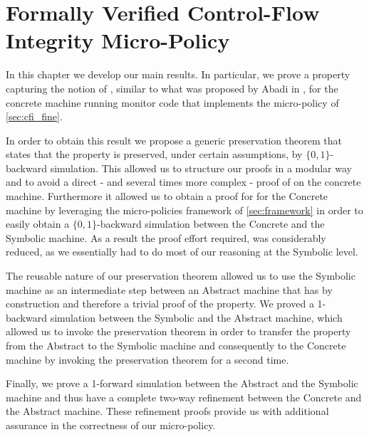 \chapter{Formally Verified Control-Flow Integrity Micro-Policy}
\label{ch:verified_cfi}


In this chapter we develop our main results. In particular, we prove a
property capturing the notion of \CFI, similar to what was proposed by
Abadi \ETAL in \cite{AbadiBEL09}, for the concrete machine running
monitor code that implements the micro-policy of \cref{sec:cfi_fine}.

In order to obtain this result we propose a generic preservation
theorem that states that the \CFI property is preserved, under certain
assumptions, by $\lbrace 0,1 \rbrace$-backward simulation. This
allowed us to structure our proofs in a modular way and to avoid a
direct - and several times more complex - proof of \CFI on the
concrete machine. Furthermore it allowed us to obtain a proof for \CFI
for the Concrete machine by leveraging the micro-policies framework of
\cref{sec:framework} in order to easily obtain a $\lbrace 0,1
\rbrace$-backward simulation between the Concrete and the Symbolic
machine. As a result the proof effort required, was considerably
reduced, as we essentially had to do most of our reasoning at the
Symbolic level.

The reusable nature of our preservation theorem allowed us to use the
Symbolic machine as an intermediate step between an Abstract machine
that has \CFI by construction and therefore a trivial proof of the
\CFI property.  We proved a 1-backward simulation between the Symbolic
and the Abstract machine, which allowed us to invoke the preservation
theorem in order to transfer the \CFI property from the Abstract to
the Symbolic machine and consequently to the Concrete machine by
invoking the preservation theorem for a second time.

Finally, we prove a 1-forward simulation between the Abstract and the
Symbolic machine and thus have a complete two-way refinement between
the Concrete and the Abstract machine. These refinement proofs provide
us with additional assurance in the correctness of our micro-policy.


